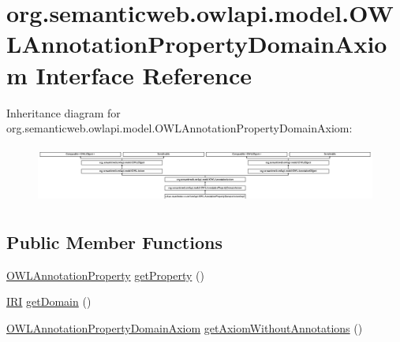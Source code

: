 \hypertarget{interfaceorg_1_1semanticweb_1_1owlapi_1_1model_1_1_o_w_l_annotation_property_domain_axiom}{\section{org.\-semanticweb.\-owlapi.\-model.\-O\-W\-L\-Annotation\-Property\-Domain\-Axiom Interface Reference}
\label{interfaceorg_1_1semanticweb_1_1owlapi_1_1model_1_1_o_w_l_annotation_property_domain_axiom}
}
Inheritance diagram for org.\-semanticweb.\-owlapi.\-model.\-O\-W\-L\-Annotation\-Property\-Domain\-Axiom\-:\begin{figure}[H]
\begin{center}
\leavevmode
\includegraphics[height=1.913440cm]{interfaceorg_1_1semanticweb_1_1owlapi_1_1model_1_1_o_w_l_annotation_property_domain_axiom}
\end{center}
\end{figure}
\subsection*{Public Member Functions}
\begin{DoxyCompactItemize}
\item 
\hyperlink{interfaceorg_1_1semanticweb_1_1owlapi_1_1model_1_1_o_w_l_annotation_property}{O\-W\-L\-Annotation\-Property} \hyperlink{interfaceorg_1_1semanticweb_1_1owlapi_1_1model_1_1_o_w_l_annotation_property_domain_axiom_a0b2dc2ef05946f791f3a2e91003db105}{get\-Property} ()
\item 
\hyperlink{classorg_1_1semanticweb_1_1owlapi_1_1model_1_1_i_r_i}{I\-R\-I} \hyperlink{interfaceorg_1_1semanticweb_1_1owlapi_1_1model_1_1_o_w_l_annotation_property_domain_axiom_a0410fce41229b6bb0e129756c60b41cb}{get\-Domain} ()
\item 
\hyperlink{interfaceorg_1_1semanticweb_1_1owlapi_1_1model_1_1_o_w_l_annotation_property_domain_axiom}{O\-W\-L\-Annotation\-Property\-Domain\-Axiom} \hyperlink{interfaceorg_1_1semanticweb_1_1owlapi_1_1model_1_1_o_w_l_annotation_property_domain_axiom_a75abdb46bfbbf591b721bf3c692c8046}{get\-Axiom\-Without\-Annotations} ()
\end{DoxyCompactItemize}


